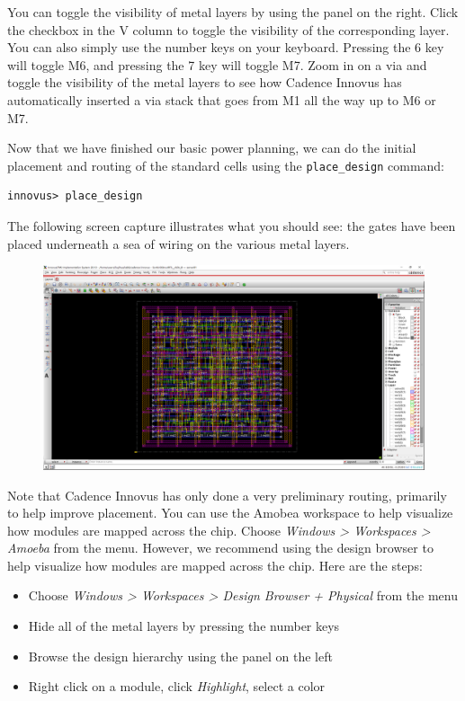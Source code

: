\documentclass[a4paper,12pt,twoside]{article}
\begin{document}
You can toggle the visibility of metal layers by using the panel on the right. Click the checkbox in the V column to toggle the visibility of the corresponding layer. You can also simply use the number keys on your keyboard. Pressing the 6 key will toggle M6, and pressing the 7 key will toggle M7. Zoom in on a via and toggle the visibility of the metal layers to see how Cadence Innovus has automatically inserted a via stack that goes from M1 all the way up to M6 or M7.

Now that we have finished our basic power planning, we can do the initial placement and routing of the standard cells using the \texttt{place\_design} command:
\begin{verbatim}
innovus> place_design
\end{verbatim}
The following screen capture illustrates what you should see: the gates have been placed underneath a sea of wiring on the various metal layers.
\begin{figure}[H]
    \centering
    \includegraphics[width=\textwidth]{images/14.png}
\end{figure}
Note that Cadence Innovus has only done a very preliminary routing, primarily to help improve placement. You can use the Amobea workspace to help visualize how modules are mapped across the chip. Choose \textit{Windows > Workspaces > Amoeba} from the menu. However, we recommend using the design browser to help visualize how modules are mapped across the chip. Here are the steps:
\begin{itemize}
    \item Choose \textit{Windows > Workspaces > Design Browser + Physical} from the menu
    \item Hide all of the metal layers by pressing the number keys
    \item Browse the design hierarchy using the panel on the left
    \item Right click on a module, click \textit{Highlight}, select a color
\end{itemize}
\end{document}
